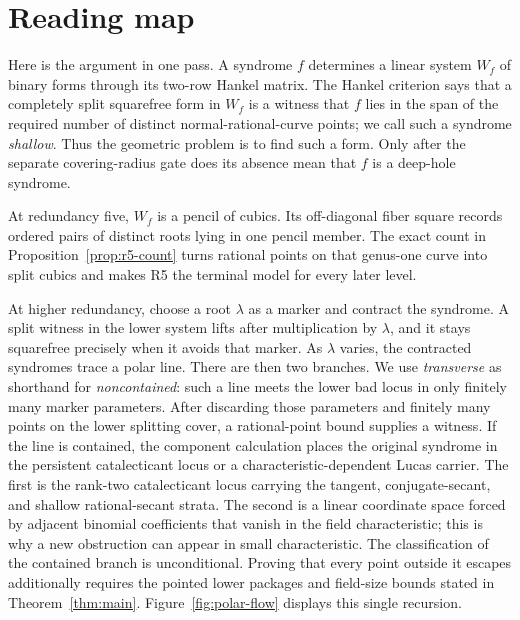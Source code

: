 \section{Reading map}\label{sec:overview}

Here is the argument in one pass.  A syndrome \(f\) determines a linear
system \(W_f\) of binary forms through its two-row Hankel matrix.  The
Hankel criterion says that a completely split squarefree form in \(W_f\)
is a witness that \(f\) lies in the span of the required number of distinct
normal-rational-curve points; we call such a syndrome \emph{shallow}.  Thus
the geometric problem is to find such a form.  Only after the separate
covering-radius gate does its absence mean that \(f\) is a deep-hole
syndrome.

At redundancy five, \(W_f\) is a pencil of cubics.  Its off-diagonal fiber
square records ordered pairs of distinct roots lying in one pencil member.
The exact count in Proposition~\ref{prop:r5-count} turns rational
points on that genus-one curve into split cubics and makes R5 the terminal
model for every later level.

At higher redundancy, choose a root \(\lambda\) as a marker and contract the
syndrome.  A split witness in the lower system lifts after multiplication by
\(\lambda\), and it stays squarefree precisely when it avoids that marker.
As \(\lambda\) varies, the contracted syndromes trace a polar line.  There
are then two branches.  We use \emph{transverse} as shorthand for
\emph{noncontained}: such a line meets the lower bad locus in only finitely
many marker parameters.  After discarding those parameters and finitely many
points on the lower splitting cover, a rational-point bound supplies a
witness.  If the line is contained, the component calculation places the
original syndrome in the persistent catalecticant locus or a
characteristic-dependent Lucas carrier.  The first is the rank-two
catalecticant locus carrying the tangent, conjugate-secant, and shallow
rational-secant strata.  The second is a linear coordinate space forced by
adjacent binomial coefficients that vanish in the field characteristic; this
is why a new obstruction can appear in small characteristic.  The
classification of the contained branch is unconditional.  Proving that every
point outside it escapes additionally requires the pointed lower packages and
field-size bounds stated in Theorem~\ref{thm:main}.
Figure~\ref{fig:polar-flow} displays this single recursion.

